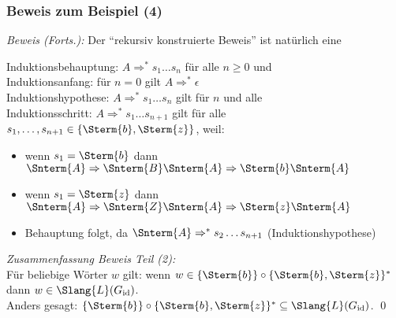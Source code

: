 \documentclass[aspectratio=1610,onlymath]{beamer}
\begin{document}
\begin{frame}\frametitle{Beweis zum Beispiel (4)}

%
\bigskip

\emph{Beweis (Forts.):} Der "`rekursiv konstruierte Beweis"' ist natürlich eine 
\medskip

\alert{Induktionsbehauptung:} $A\Rightarrow^* s_1\ldots s_n$ für alle $n\geq 0$ und \\
\alert{Induktionsanfang:} für $n=0$ gilt $A\Rightarrow^* \epsilon$\\
\alert{Induktionshypothese:} $A\Rightarrow^* s_1\ldots s_n$ gilt für $n$ und alle \\
\alert{Induktionsschritt:} $A\Rightarrow^* s_1\ldots s_{n+1}$ gilt für alle $s_1,\ldots,s_{n+1}\in \{\Sterm{b},\Sterm{z}\}$, weil:\\
\begin{itemize}
\item wenn $s_1=\Sterm{b}$ dann $\Snterm{A}\Rightarrow \Snterm{B}\Snterm{A}\Rightarrow\Sterm{b}\Snterm{A}$
\item wenn $s_1=\Sterm{z}$ dann $\Snterm{A}\Rightarrow \Snterm{Z}\Snterm{A}\Rightarrow\Sterm{z}\Snterm{A}$
\item Behauptung folgt, da $\Snterm{A}\Rightarrow^* s_2\ldots s_{n+1}$ (Induktionshypothese)
\end{itemize}
\medskip\pause

\emph{Zusammenfassung Beweis Teil (2):}\\
Für beliebige Wörter $w$ gilt: wenn $w\in\{\Sterm{b}\}\circ \{\Sterm{b},\Sterm{z}\}^*$ dann $w\in\Slang{L}(G_{\text{id}})$.\\
Anders gesagt: $\{\Sterm{b}\}\circ \{\Sterm{b},\Sterm{z}\}^*\subseteq \Slang{L}(G_{\text{id}})$.
\qed

\end{frame}


\end{document}
